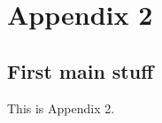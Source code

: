 \chapter{Appendix 2}
\label{ch:appendixTwo}

\section{First main stuff}
\label{sec:ch_1_firstmain}

This is Appendix 2.
